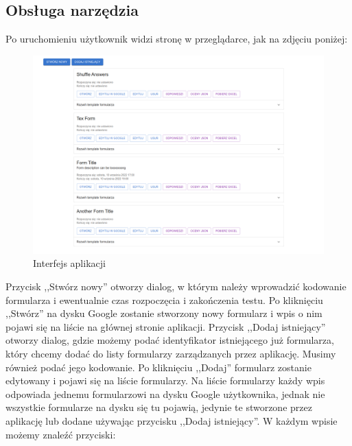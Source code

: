 \subsection{Obsługa narzędzia}
Po uruchomieniu użytkownik widzi stronę w przeglądarce, jak na zdjęciu poniżej:
\begin{figure}[H]
 \centering
  \includegraphics[scale=0.26]{strona.png}
  \caption{Interfejs aplikacji}
  \label{fig:2}
\end{figure}
Przycisk ,,Stwórz nowy'' otworzy dialog, w którym należy wprowadzić kodowanie 
formularza i ewentualnie czas rozpoczęcia i zakończenia testu. Po kliknięciu 
,,Stwórz'' na dysku Google zostanie stworzony nowy formularz i wpis o nim pojawi
się na liście na głównej stronie aplikacji. Przycisk ,,Dodaj istniejący'' otworzy
dialog, gdzie możemy podać identyfikator istniejącego już formularza, który chcemy
dodać do listy formularzy zarządzanych przez aplikację. Musimy również podać jego
kodowanie. Po kliknięciu ,,Dodaj'' formularz zostanie edytowany i pojawi się na 
liście formularzy. Na liście formularzy każdy wpis odpowiada jednemu formularzowi
na dysku Google użytkownika, jednak nie wszystkie formularze na dysku się tu pojawią,
jedynie te stworzone przez aplikację lub dodane używając przycisku ,,Dodaj istniejący''.
W każdym wpisie możemy znaleźć przyciski:
